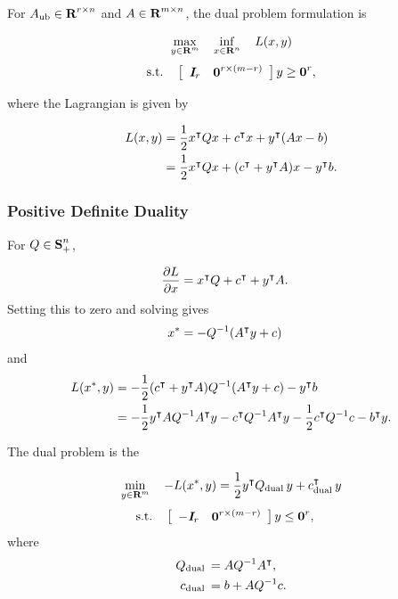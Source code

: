 \documentclass{article}
\begin{document}
    For $A_{\text{ub}}\in\textbf{R}^{{r}\times n}$ and $A\in\textbf{R}^{m\times n}$, the dual problem formulation is

    \begin{align*}
        \max_{y\in\textbf{R}^m}\quad 
        \inf_{x\in\textbf{R}^n}\quad L(x,y)
    \end{align*}
    \begin{align*}
        \text{s.t.}\quad  \left[\begin{array}{lllllllllllllllllll}\emph{\textbf{I}}_{r}&\textbf{0}^{{r}\times (m-{r})}\end{array}\right]y\geq \textbf{0}^{r},
    \end{align*}

    where the Lagrangian is given by

    \begin{align*}
        L(x,y) &= \frac{1}{2} x^\intercal Q x+c^\intercal x
        + y^\intercal (A x - b)\\
        &= \frac{1}{2} x^\intercal Q x+(c^\intercal +y^\intercal A )x -y^\intercal b.
    \end{align*}

\subsubsection{Positive Definite Duality}

    For $Q\in\textbf{S}_+^n$,

        \begin{align*}
        \frac{\partial L}{\partial x}&=x^\intercal Q+  
        c^\intercal+y^\intercal A.
    \end{align*}
    Setting this to zero and solving gives
    \begin{align*}
        x^*&=-Q^{-1}(A^\intercal y+c)
    \end{align*}
    and
    \begin{align*}
        L(x^*,y) &= 
        -\frac{1}{2}(c^\intercal +y^\intercal A )Q^{-1}(A^\intercal y+c) 
        -y^\intercal b\\
        &=
        - \frac{1}{2} y^\intercal A Q^{-1} A^\intercal y
        -
        c^\intercal Q^{-1} A^\intercal y
        - \frac{1}{2} c^\intercal Q^{-1}c
        -
        b^\intercal y.
    \end{align*}

    The dual problem is the \QP

    \begin{align*}
        \min_{y\in\textbf{R}^m}\quad -L(x^*,y)=\frac{1}{2} y^\intercal Q_{\text{dual}\:} y + c_{\text{dual}\:}^\intercal y
    \end{align*}
    \begin{align*}
        \text{s.t.}\quad  \left[\begin{array}{lllllllllllllllllll}-\emph{\textbf{I}}_{r}&\textbf{0}^{{r}\times (m-{r})}\end{array}\right]y&\leq \textbf{0}^{r},
    \end{align*}
    where
    \begin{align*}
        Q_{\text{dual}\:}&=A Q^{-1} A^\intercal,\\
        c_{\text{dual}\:}&=b+A Q^{-1} c.
    \end{align*}
\end{document}
